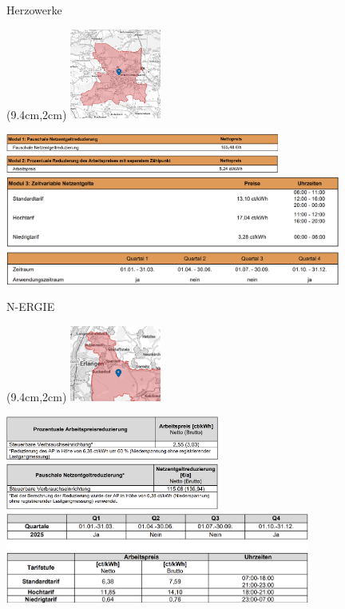 \begin{frame}{Herzowerke}
   \begin{textblock*}{3.3cm}(9.4cm,2cm)
      \includegraphics[width=3cm]{images/Karte_Herzowerke.png}
   \end{textblock*}
   \vspace{1.1cm}
   \includegraphics[width=9cm]{images/HerzoWerke-Modul1.png}
   \vspace{0.2cm}
   \includegraphics[width=9cm]{images/HerzoWerke-Modul2.png}
   \vspace{0.2cm}
   \includegraphics[width=11cm]{images/HerzoWerke-Modul3.png}
\end{frame}

\begin{frame}{N-ERGIE}
   \begin{textblock*}{3.3cm}(9.4cm,2cm)
      \includegraphics[width=3cm]{images/Karte_N-ERGIE.png}
   \end{textblock*}   
   \includegraphics[width=7cm]{images/N-ERGIE-Modul1.png}
   \includegraphics[width=7cm]{images/N-ERGIE-Modul2.png}
   \includegraphics[width=10cm]{images/N-ERGIE-Modul3.png}
\end{frame}   

